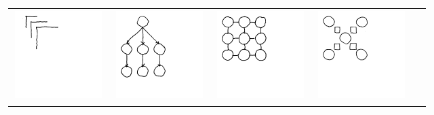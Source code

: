 \documentclass{article}
\begin{document}
\newcommand{\exampleProgramSize}{2.3cm} 
\begin{figure}
  \begin{tabular}{lllll}
  \includegraphics[width = \exampleProgramSize]{figures/expert-29.png}&
  \includegraphics[width = \exampleProgramSize]{figures/expert-52.png}&
  \includegraphics[width = \exampleProgramSize]{figures/expert-38.png}&
  \includegraphics[width = \exampleProgramSize]{figures/expert-72.png}&

\end{tabular}
\end{figure}
\end{document}
